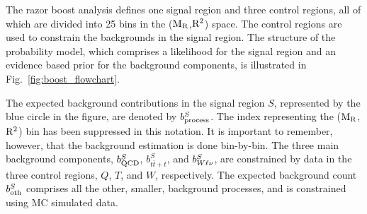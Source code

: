 

The razor boost analysis defines one signal region and three control regions, all of which are
divided into 25 bins in the ($\mathrm{M_R}$,$\mathrm{R^2}$) space. The control regions are used to constrain the
backgrounds in the signal region.
The structure of the probability model, which comprises a likelihood for the signal
region and an evidence based prior for the background components, is illustrated in
Fig.~\ref{fig:boost_flowchart}. 

The expected background contributions in the signal region $S$, represented by the blue circle in
the figure, are denoted by $b^S_{\rm process}$. The index representing the ($\mathrm{M_R}$,$\mathrm{R^2}$) bin has
been suppressed in this notation. It is important to remember, however, that the background
estimation is done bin-by-bin.  
The three main background components, $b^S_{\rm QCD}$, $b^S_{t\bar{t}+t}$, and $b^S_{W\ell\nu}$,
are constrained by data in the three control regions, $Q$, $T$, and $W$, respectively. 
The expected background count $b_{\rm oth}^S$ comprises all the other, smaller, background
processes, and is constrained using MC simulated data. 

